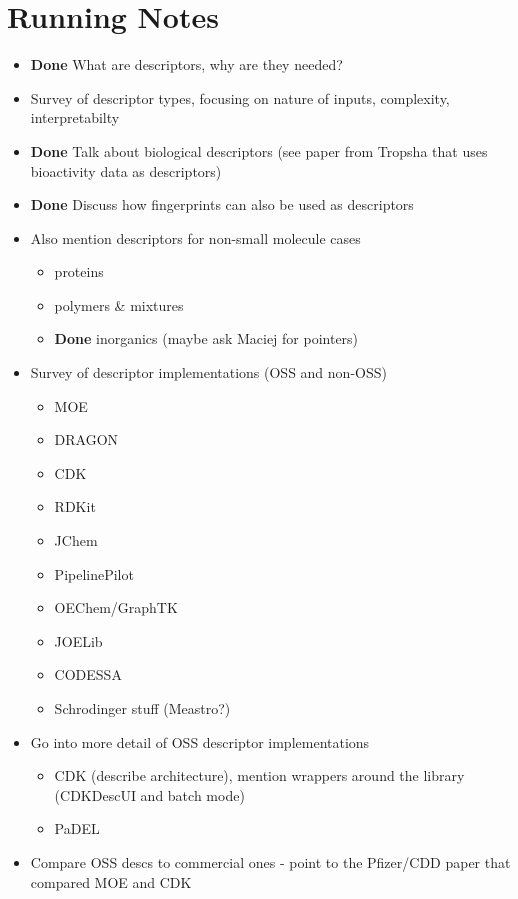 \documentclass[letterpaper, 12pt]{article}
\begin{document}
\section{Running Notes}
\begin{itemize}
\item \textbf{Done} What are descriptors, why are they needed?
\item Survey of descriptor types, focusing on nature of inputs,
  complexity, interpretabilty 
\item \textbf{Done} Talk about biological descriptors (see paper from Tropsha that
  uses bioactivity data as descriptors)
\item \textbf{Done} Discuss how fingerprints can also be used as descriptors
\item Also mention descriptors for non-small molecule cases
  \begin{itemize}
  \item proteins
  \item polymers \& mixtures
  \item \textbf{Done} inorganics (maybe ask Maciej for pointers)
  \end{itemize}
\item Survey of descriptor implementations (OSS and non-OSS)
  \begin{itemize}
  \item MOE
  \item DRAGON
  \item CDK
  \item RDKit
  \item JChem
  \item PipelinePilot
  \item OEChem/GraphTK
  \item JOELib
  \item CODESSA
  \item Schrodinger stuff (Meastro?)
  \end{itemize}
\item Go into more detail of OSS descriptor implementations
  \begin{itemize}
  \item CDK (describe architecture), mention wrappers around the
    library (CDKDescUI and batch mode)
  \item PaDEL
  \end{itemize}
\item Compare OSS descs to commercial ones - point to the Pfizer/CDD
  paper that compared MOE and CDK
\end{itemize}
\clearpage
\newpage
\end{document}
